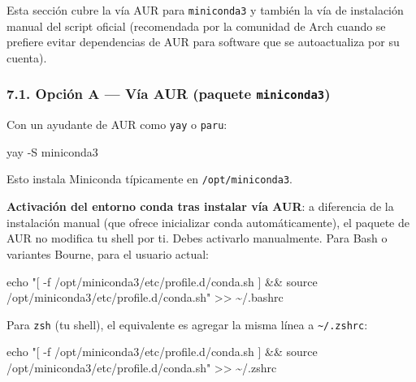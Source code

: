 \documentclass[
  doc,
  floatsintext,
  longtable,
  a4paper,
  nolmodern,
  notxfonts,
  notimes,
  12pt,
  colorlinks=true,linkcolor=blue,citecolor=blue,urlcolor=blue]{apa7}
\newenvironment{Shaded}{\begin{snugshade}}{\end{snugshade}}
\newcommand{\AttributeTok}[1]{\textcolor[rgb]{0.40,0.45,0.13}{#1}}
\newcommand{\BuiltInTok}[1]{\textcolor[rgb]{0.00,0.23,0.31}{#1}}
\newcommand{\ExtensionTok}[1]{\textcolor[rgb]{0.00,0.23,0.31}{#1}}
\newcommand{\NormalTok}[1]{\textcolor[rgb]{0.00,0.23,0.31}{#1}}
\newcommand{\OperatorTok}[1]{\textcolor[rgb]{0.37,0.37,0.37}{#1}}
\newcommand{\StringTok}[1]{\textcolor[rgb]{0.13,0.47,0.30}{#1}}
\begin{document}
Esta sección cubre la vía AUR para \texttt{miniconda3} y también la vía
de instalación manual del script oficial (recomendada por la comunidad
de Arch cuando se prefiere evitar dependencias de AUR para software que
se autoactualiza por su cuenta).

\subsubsection{\texorpdfstring{7.1. Opción A --- Vía AUR (paquete
\texttt{miniconda3})}{7.1. Opción A --- Vía AUR (paquete miniconda3)}}\label{opciuxf3n-a-vuxeda-aur-paquete-miniconda3}

Con un ayudante de AUR como \texttt{yay} o \texttt{paru}:

\begin{Shaded}
\begin{Highlighting}[]
\ExtensionTok{yay} \AttributeTok{{-}S}\NormalTok{ miniconda3}
\end{Highlighting}
\end{Shaded}

Esto instala Miniconda típicamente en \texttt{/opt/miniconda3}.

\textbf{Activación del entorno conda tras instalar vía AUR}: a
diferencia de la instalación manual (que ofrece inicializar conda
automáticamente), el paquete de AUR no modifica tu shell por ti. Debes
activarlo manualmente. Para Bash o variantes Bourne, para el usuario
actual:

\begin{Shaded}
\begin{Highlighting}[]
\BuiltInTok{echo} \StringTok{"[ {-}f /opt/miniconda3/etc/profile.d/conda.sh ] \&\& source /opt/miniconda3/etc/profile.d/conda.sh"} \OperatorTok{\textgreater{}\textgreater{}}\NormalTok{ \textasciitilde{}/.bashrc}
\end{Highlighting}
\end{Shaded}

Para \texttt{zsh} (tu shell), el equivalente es agregar la misma línea a
\texttt{\textasciitilde{}/.zshrc}:

\begin{Shaded}
\begin{Highlighting}[]
\BuiltInTok{echo} \StringTok{"[ {-}f /opt/miniconda3/etc/profile.d/conda.sh ] \&\& source /opt/miniconda3/etc/profile.d/conda.sh"} \OperatorTok{\textgreater{}\textgreater{}}\NormalTok{ \textasciitilde{}/.zshrc}
\end{Highlighting}
\end{Shaded}
\end{document}

